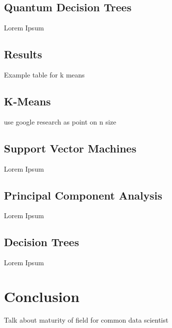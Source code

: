 \documentclass[conference]{IEEEtran}
\begin{document}
\subsection{Quantum Decision Trees}
Lorem Ipsum


\subsection{Results}
Example table for k means
\subsection{K-Means}
use google research as point on n size 
\subsection{Support Vector Machines}

Lorem Ipsum
\subsection{Principal Component Analysis}
Lorem Ipsum
\subsection{Decision Trees}
Lorem Ipsum

\section{Conclusion}
Talk about maturity of field for common data scientist 
\end{document}

